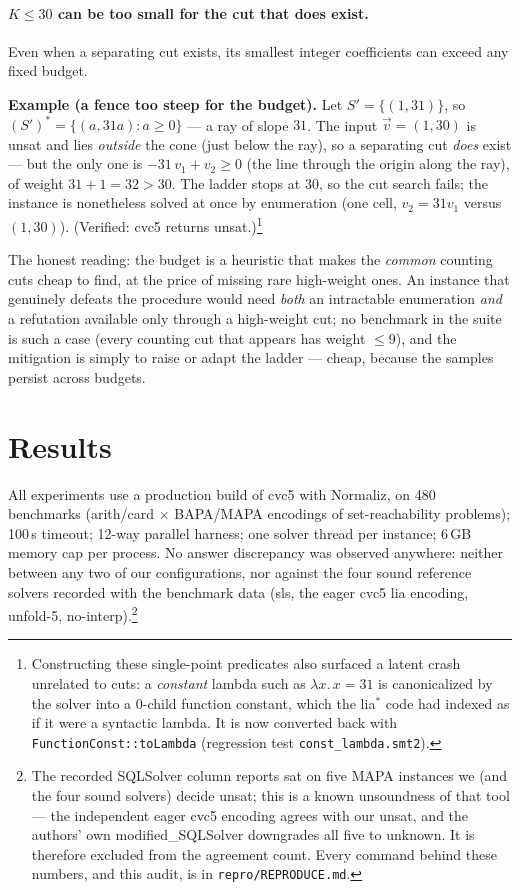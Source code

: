 \documentclass[11pt]{article}
\newcommand{\cvc}{\textsf{cvc5}\xspace}
\newcommand{\normaliz}{\textsf{Normaliz}\xspace}
\newcommand{\Sset}{\ensuremath{S}}
\newcommand{\vv}{\ensuremath{\vec{v}}\xspace}
\begin{document}
\paragraph{$K \le 30$ can be too small for the cut that does exist.}
Even when a separating cut exists, its smallest integer coefficients can
exceed any fixed budget.

\begin{exbox}
\textbf{Example (a fence too steep for the budget).} Let
$\Sset' = \{(1,31)\}$, so $(S')^{*} = \{(a,31a) : a \ge 0\}$ --- a ray of
slope $31$. The input $\vv = (1,30)$ is \textsf{unsat} and lies
\emph{outside} the cone (just below the ray), so a separating cut
\emph{does} exist --- but the only one is $-31\,v_1 + v_2 \ge 0$ (the line
through the origin along the ray), of weight $31 + 1 = 32 > 30$. The ladder
stops at $30$, so the cut search fails; the instance is nonetheless solved
at once by enumeration (one cell, $v_2 = 31 v_1$ versus $(1,30)$).
(Verified: \cvc returns \textsf{unsat}.)\footnote{Constructing these
single-point predicates also surfaced a latent crash unrelated to cuts: a
\emph{constant} lambda such as $\lambda x.\,x{=}31$ is canonicalized by the
solver into a 0-child function constant, which the lia$^*$ code had indexed
as if it were a syntactic lambda. It is now converted back with
\texttt{FunctionConst::toLambda} (regression test
\texttt{const\_lambda.smt2}).}
\end{exbox}

The honest reading: the budget is a heuristic that makes the \emph{common}
counting cuts cheap to find, at the price of missing rare high-weight ones.
An instance that genuinely defeats the procedure would need \emph{both} an
intractable enumeration \emph{and} a refutation available only through a
high-weight cut; no benchmark in the suite is such a case (every counting
cut that appears has weight $\le 9$), and the mitigation is simply to raise
or adapt the ladder --- cheap, because the samples persist across budgets.

\section{Results}

All experiments use a production build of \cvc with \normaliz, on 480
benchmarks (arith/card $\times$ BAPA/MAPA encodings of set-reachability
problems);
100\,s timeout; 12-way parallel harness; one solver thread per instance;
6\,GB memory cap per process. No answer
discrepancy was observed anywhere: neither between any two of our
configurations, nor against the four sound reference solvers recorded with
the benchmark data (\textsf{sls}, the eager \textsf{cvc5 lia} encoding,
\textsf{unfold-5}, \textsf{no-interp}).\footnote{The recorded \textsf{SQLSolver}
column reports \textsf{sat} on five MAPA instances we (and the four sound
solvers) decide \textsf{unsat}; this is a known unsoundness of that tool ---
the independent eager \textsf{cvc5} encoding agrees with our \textsf{unsat},
and the authors' own \textsf{modified\_SQLSolver} downgrades all five to
\textsf{unknown}. It is therefore excluded from the agreement count. Every
command behind these numbers, and this audit, is in
\texttt{repro/REPRODUCE.md}.}
\end{document}

